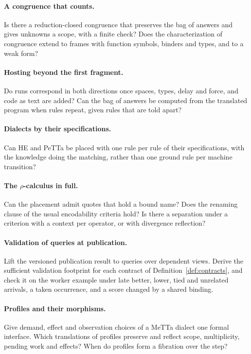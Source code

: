 \documentclass[11pt]{article}
\theoremstyle{plain}
\theoremstyle{definition}
\theoremstyle{remark}
\begin{document}
\paragraph{A congruence that counts.} Is there a reduction-closed congruence that preserves the
bag of answers and gives unknowns a scope, with a finite check? Does the characterization of
congruence extend to frames with function symbols, binders and types, and to a weak form?

\paragraph{Hosting beyond the first fragment.} Do runs correspond in both directions once spaces,
types, delay and force, and code as text are added? Can the bag of answers be computed from the
translated program when rules repeat, given rules that are told apart?

\paragraph{Dialects by their specifications.} Can HE and PeTTa be placed with one rule per rule of
their specifications, with the knowledge doing the matching, rather than one ground rule per
machine transition?

\paragraph{The $\rho$-calculus in full.} Can the placement admit quotes that hold a bound name?
Does the renaming clause of the usual encodability criteria hold? Is there a separation under a
criterion with a context per operator, or with divergence reflection?

\paragraph{Validation of queries at publication.} Lift the versioned publication result to
queries over dependent views. Derive the sufficient validation footprint for each contract of
Definition~\ref{def:contracts}, and check it on the worker example under late better, lower, tied
and unrelated arrivals, a taken occurrence, and a score changed by a shared binding.

\paragraph{Profiles and their morphisms.} Give demand, effect and observation choices of a MeTTa
dialect one formal interface. Which translations of profiles preserve and reflect scope,
multiplicity, pending work and effects? When do profiles form a fibration over the step?
\end{document}
